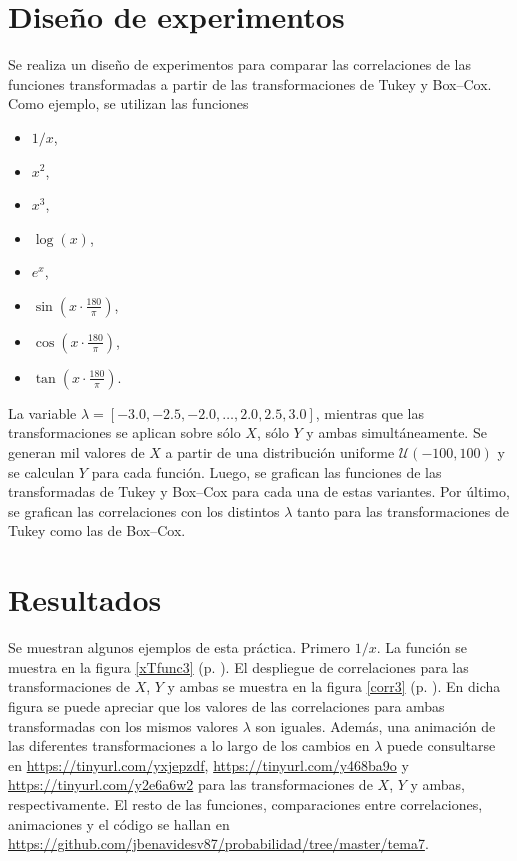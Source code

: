 \documentclass[paper=leter, fontsize=11pt]{scrartcl}
\numberwithin{equation}{section}		%
\numberwithin{figure}{section}			%
\numberwithin{table}{section}				%
\begin{document}
\section{Diseño de experimentos}
Se realiza un diseño de experimentos para comparar las correlaciones de las funciones transformadas a partir de las transformaciones de Tukey y Box--Cox. Como ejemplo, se utilizan las funciones
\begin{itemize}
    \item $1 / x$,
    \item $x ^ 2$,
    \item $x ^ 3$,
    \item $\log (x)$,
    \item $e ^ x$,
    \item $\sin(x \cdot \frac{180}{\pi})$,
    \item $\cos(x \cdot \frac{180}{\pi})$,
    \item $\tan(x \cdot \frac{180}{\pi})$.
\end{itemize}

La variable  $\lambda = [-3.0, -2.5, -2.0, \ldots, 2.0, 2.5, 3.0 ]$, mientras que las transformaciones se aplican sobre sólo $X$, sólo $Y$ y ambas simultáneamente. Se generan mil valores de $X$ a partir de una distribución uniforme $\mathcal{U}(-100, 100)$ y se calculan $Y$ para cada función. Luego, se grafican las funciones de las transformadas de Tukey y Box--Cox para cada una de estas variantes. Por último, se grafican las correlaciones con los distintos $\lambda$ tanto para las transformaciones de Tukey como las de Box--Cox.

\section{Resultados}
Se muestran algunos ejemplos de esta práctica. Primero $1/x$. La función se muestra en la figura \ref{xTfunc3} (p. \pageref{xTfunc3}). El despliegue de correlaciones para las transformaciones de $X$, $Y$ y ambas se muestra en la figura \ref{corr3} (p. \pageref{corr3}). En dicha figura se puede apreciar que los valores de las correlaciones para ambas transformadas con los mismos valores $\lambda$ son iguales. Además, una animación de las diferentes transformaciones a lo largo de los cambios en $\lambda$ puede consultarse en \url{https://tinyurl.com/yxjepzdf}, \url{https://tinyurl.com/y468ba9o} y \url{https://tinyurl.com/y2e6a6w2} para las transformaciones de $X$, $Y$ y ambas, respectivamente. El resto de las funciones, comparaciones entre correlaciones, animaciones y el código se hallan en \url{https://github.com/jbenavidesv87/probabilidad/tree/master/tema7}.
\end{document}
